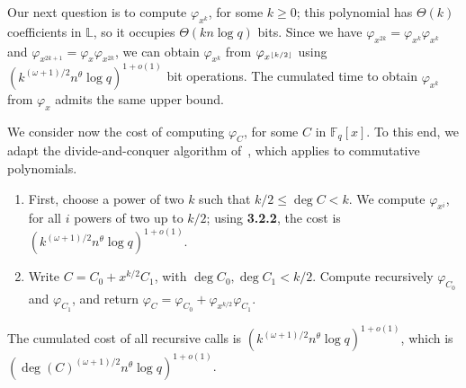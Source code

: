 \documentclass[sigconf]{acmart}
\newcommand{\F}{\mathbb{F}}
\renewcommand{\L}{\mathbb{L}}
\DeclarePairedDelimiter\floor{\lfloor}{\rfloor}
\begin{document}
\smallskip{} Our next question is to compute
$\varphi_{x^k}$, for some $k \ge 0$; this polynomial has
$\Theta(k)$ coefficients in $\L$, so it occupies $\Theta(k n \log q)$
bits. Since we have $\varphi_{x^{2k}}=\varphi_{x^{k}}\varphi_{x^{k}}$
and $\varphi_{x^{2k+1}} = \varphi_x\varphi_{x^{2k}}$, we can obtain
$\varphi_{x^k}$ from $\varphi_{x^{\floor*{k/2}}}$ using
$ (k^{(\omega+1)/2} n^\theta \log q)^{1+o(1)}$ bit operations.
The cumulated time to obtain $\varphi_{x^k}$ from $\varphi_x$ admits
the same upper bound.

\smallskip{} We consider now the cost of computing
$\varphi_C$, for some $C$ in $\F_q[x]$. To this end, we adapt the
divide-and-conquer algorithm
of~\cite[Ch.~9]{Gathen:2003:MCA:945759}, which applies to
commutative polynomials.
\begin{enumerate}
\item First, choose a power of two $k$ such that $k/2 \le \deg C <
  k$. We compute $\varphi_{x^i}$, for all $i$ powers of two up to
  $k/2$; using {\bf 3.2.2}, the cost is $(k^{(\omega+1)/2}
  n^\theta\log q)^{1+o(1)}$.
\item Write $C = C_0 + x^{k/2} C_1$, with $\deg C_0,\deg C_1 <
  k/2$. Compute recursively $\varphi_{C_0}$ and $\varphi_{C_1}$, and
  return $\varphi_C = \varphi_{C_0} + \varphi_{x^{k/2}}
  \varphi_{C_1}$.
\end{enumerate}
The cumulated cost of all recursive calls is
$(k^{(\omega+1)/2} n^\theta\log q)^{1+o(1)}$, which is $(\deg
(C)^{(\omega+1)/2} n^\theta\log q)^{1+o(1)}$.
\end{document}
